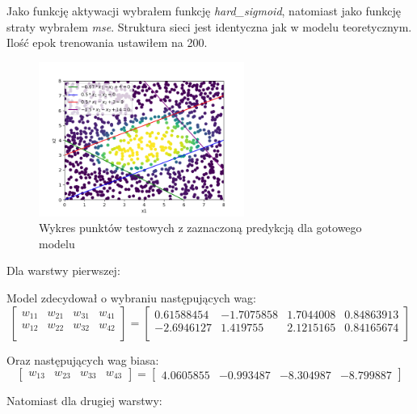 \documentclass{article}
\begin{document}
Jako funkcję aktywacji wybrałem funkcję \textit{hard\_sigmoid}, natomiast
jako funkcję straty wybrałem \textit{mse}. Struktura sieci jest identyczna
jak w modelu teoretycznym. Ilość epok trenowania ustawiłem na 200.

\begin{figure}[H]
    \centering
    \includegraphics[width=0.6\textwidth]{Zad4/punkty.png}
    \caption{Wykres punktów testowych z zaznaczoną predykcją dla gotowego modelu}
\end{figure}


Dla warstwy pierwszej:

Model zdecydował o wybraniu następujących wag:
\begin{equation*}
    \begin{bmatrix}
        w_{11} & w_{21} & w_{31} & w_{41} \\
        w_{12} & w_{22} & w_{32} & w_{42} \\
    \end{bmatrix}
    =
    \begin{bmatrix}
        0.61588454 & -1.7075858 & 1.7044008 & 0.84863913 \\
        -2.6946127 & 1.419755 & 2.1215165 & 0.84165674 \\
    \end{bmatrix}
\end{equation*}

Oraz następujących wag biasa:
\begin{equation*}
    \begin{bmatrix}
        w_{13} & w_{23} & w_{33} & w_{43}
    \end{bmatrix}
    =
    \begin{bmatrix}
        4.0605855 & -0.993487 & -8.304987 & -8.799887
    \end{bmatrix}
\end{equation*}

Natomiast dla drugiej warstwy:
\end{document}
